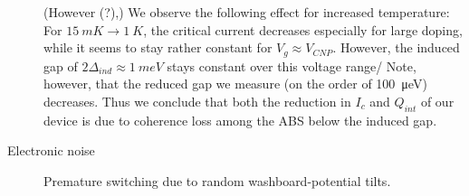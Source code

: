 \begin{description}
	(However (?),) We observe the following effect for increased temperature:
	For $\SI{15}{mK}\rightarrow\SI{1}{K}$, the critical current decreases especially for large doping, while it seems to stay rather constant for $V_g\approx V_{CNP}$.
	However, the induced gap of $2\Delta_{ind}\approx\SI{1}{meV}$ stays constant over this voltage range/ Note, however, that the reduced gap we measure (on the order of \SI{100}{\micro eV}) decreases.
	Thus we conclude that both the reduction in $I_c$ and $Q_{int}$ of our device is due to coherence loss among the ABS below the induced gap.
	\item[Electronic noise] Premature switching due to random washboard-potential tilts.
\end{description}

